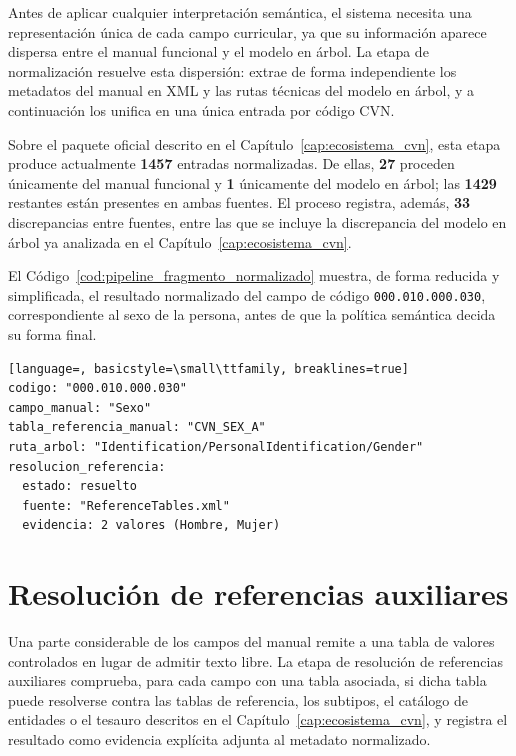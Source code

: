 Antes de aplicar cualquier interpretación semántica, el sistema necesita una
representación única de cada campo curricular, ya que su información aparece
dispersa entre el manual funcional y el modelo en árbol. La etapa de
normalización resuelve esta dispersión: extrae de forma independiente los
metadatos del manual en XML y las rutas técnicas del modelo en árbol, y a
continuación los unifica en una única entrada por código CVN.

Sobre el paquete oficial descrito en el Capítulo~\ref{cap:ecosistema_cvn}, esta
etapa produce actualmente \textbf{1457} entradas normalizadas. De ellas,
\textbf{27} proceden únicamente del manual funcional y \textbf{1} únicamente
del modelo en árbol; las \textbf{1429} restantes están presentes en ambas
fuentes. El proceso registra, además, \textbf{33} discrepancias entre fuentes,
entre las que se incluye la discrepancia del modelo en árbol ya analizada en
el Capítulo~\ref{cap:ecosistema_cvn}.

El Código~\ref{cod:pipeline_fragmento_normalizado} muestra, de forma reducida
y simplificada, el resultado normalizado del campo de código
\texttt{000.010.000.030}, correspondiente al sexo de la persona, antes de que
la política semántica decida su forma final.

\begin{code}[htbp]
\begin{lstlisting}[language=, basicstyle=\small\ttfamily, breaklines=true]
codigo: "000.010.000.030"
campo_manual: "Sexo"
tabla_referencia_manual: "CVN_SEX_A"
ruta_arbol: "Identification/PersonalIdentification/Gender"
resolucion_referencia:
  estado: resuelto
  fuente: "ReferenceTables.xml"
  evidencia: 2 valores (Hombre, Mujer)
\end{lstlisting}
\caption{Fragmento reducido del metadato normalizado del campo de sexo.}
\label{cod:pipeline_fragmento_normalizado}
\end{code}

\section{Resolución de referencias auxiliares}
\label{sec:pipeline_resolucion_auxiliar}

Una parte considerable de los campos del manual remite a una tabla de
valores controlados en lugar de admitir texto libre. La etapa de resolución
de referencias auxiliares comprueba, para cada campo con una tabla asociada,
si dicha tabla puede resolverse contra las tablas de referencia, los
subtipos, el catálogo de entidades o el tesauro descritos en el
Capítulo~\ref{cap:ecosistema_cvn}, y registra el resultado como evidencia
explícita adjunta al metadato normalizado.

